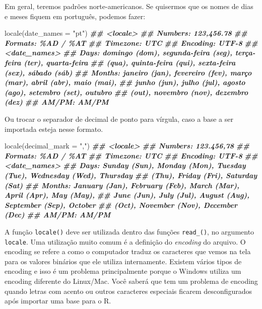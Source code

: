\documentclass[
]{book}
\newenvironment{Shaded}{\begin{snugshade}}{\end{snugshade}}
\newcommand{\AttributeTok}[1]{\textcolor[rgb]{0.77,0.63,0.00}{#1}}
\newcommand{\DocumentationTok}[1]{\textcolor[rgb]{0.56,0.35,0.01}{\textbf{\textit{#1}}}}
\newcommand{\FunctionTok}[1]{\textcolor[rgb]{0.00,0.00,0.00}{#1}}
\newcommand{\NormalTok}[1]{#1}
\newcommand{\StringTok}[1]{\textcolor[rgb]{0.31,0.60,0.02}{#1}}
\begin{document}
Em geral, teremos padrões norte-americanos. Se quisermos que os nomes de dias e meses fiquem em português, podemos fazer:

\begin{Shaded}
\begin{Highlighting}[]
\FunctionTok{locale}\NormalTok{(}\AttributeTok{date\_names =} \StringTok{"pt"}\NormalTok{)}
\DocumentationTok{\#\# \textless{}locale\textgreater{}}
\DocumentationTok{\#\# Numbers:  123,456.78}
\DocumentationTok{\#\# Formats:  \%AD / \%AT}
\DocumentationTok{\#\# Timezone: UTC}
\DocumentationTok{\#\# Encoding: UTF{-}8}
\DocumentationTok{\#\# \textless{}date\_names\textgreater{}}
\DocumentationTok{\#\# Days:   domingo (dom), segunda{-}feira (seg), terça{-}feira (ter), quarta{-}feira}
\DocumentationTok{\#\#         (qua), quinta{-}feira (qui), sexta{-}feira (sex), sábado (sáb)}
\DocumentationTok{\#\# Months: janeiro (jan), fevereiro (fev), março (mar), abril (abr), maio (mai),}
\DocumentationTok{\#\#         junho (jun), julho (jul), agosto (ago), setembro (set), outubro}
\DocumentationTok{\#\#         (out), novembro (nov), dezembro (dez)}
\DocumentationTok{\#\# AM/PM:  AM/PM}
\end{Highlighting}
\end{Shaded}

Ou trocar o separador de decimal de ponto para vírgula, caso a base a ser importada esteja nesse formato.

\begin{Shaded}
\begin{Highlighting}[]
\FunctionTok{locale}\NormalTok{(}\AttributeTok{decimal\_mark =} \StringTok{","}\NormalTok{)}
\DocumentationTok{\#\# \textless{}locale\textgreater{}}
\DocumentationTok{\#\# Numbers:  123.456,78}
\DocumentationTok{\#\# Formats:  \%AD / \%AT}
\DocumentationTok{\#\# Timezone: UTC}
\DocumentationTok{\#\# Encoding: UTF{-}8}
\DocumentationTok{\#\# \textless{}date\_names\textgreater{}}
\DocumentationTok{\#\# Days:   Sunday (Sun), Monday (Mon), Tuesday (Tue), Wednesday (Wed), Thursday}
\DocumentationTok{\#\#         (Thu), Friday (Fri), Saturday (Sat)}
\DocumentationTok{\#\# Months: January (Jan), February (Feb), March (Mar), April (Apr), May (May),}
\DocumentationTok{\#\#         June (Jun), July (Jul), August (Aug), September (Sep), October}
\DocumentationTok{\#\#         (Oct), November (Nov), December (Dec)}
\DocumentationTok{\#\# AM/PM:  AM/PM}
\end{Highlighting}
\end{Shaded}

A função \texttt{locale()} deve ser utilizada dentro das funções \texttt{read\_()}, no argumento \texttt{locale}. Uma utilização muito comum é a definição do \emph{encoding} do arquivo. O encoding se refere a como o computador traduz os caracteres que vemos na tela para os valores binários que ele utiliza internamente. Existem vários tipos de encoding e isso é um problema principalmente porque o Windows utiliza um encoding diferente do Linux/Mac. Você saberá que tem um problema de encoding quando letras com acento ou outros caracteres especiais ficarem desconfigurados após importar uma base para o R.
\end{document}

